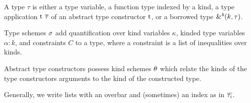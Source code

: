 A type $\tau$ is either a type variable, a function type indexed by a
kind,
a type application $\tapp{t}{\Multi{\tau}}$ of an abstract type constructor
$\T t$, or a borrowed type  $\borrowty{k}{\tau}$.

Type schemes $\schm$ add quantification over kind
variables $\kappa$, kinded type variables $\alpha:k$, and constraints
$C$ to a type, where a constraint is a list of inequalities over
kinds.

Abstract type constructors possess kind schemes $\kschm$ which relate
the kinds of the type constructors arguments to the kind of the
constructed type.

Generally, we write lists with an overbar and (sometimes) an index as
in $\Multi[i]\tau$.






